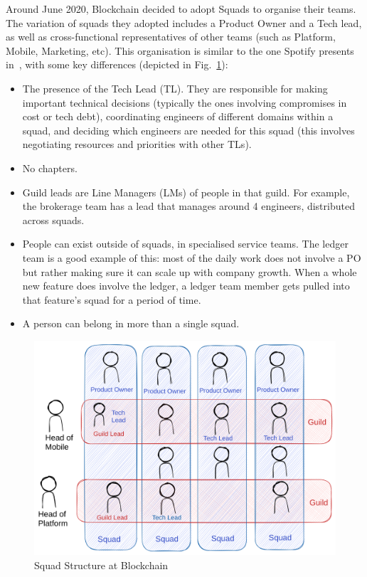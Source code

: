\documentclass[conference]{IEEEtran}
\begin{document}
    Around June 2020, Blockchain decided to adopt Squads to organise their teams.
    The variation of squads they adopted includes a Product Owner and a Tech lead, as well as cross-functional representatives of other teams (such as Platform, Mobile, Marketing, etc).
    This organisation is similar to the one Spotify presents in~\cite{spotifySquads}, with some key differences (depicted in Fig.~\ref{fig:squad}):
    \begin{itemize}
        \item The presence of the Tech Lead (TL).
        They are responsible for making important technical decisions (typically the ones involving compromises in cost or tech debt), coordinating engineers of different domains within a squad, and deciding which engineers are needed for this squad (this involves negotiating resources and priorities with other TLs).
        \item No chapters.
        \item Guild leads are Line Managers (LMs) of people in that guild.
        For example, the brokerage team has a lead that manages around 4 engineers, distributed across squads.
        \item People can exist outside of squads, in specialised service teams.
        The ledger team is a good example of this: most of the daily work does not involve a PO but rather making sure it can scale up with company growth.
        When a whole new feature does involve the ledger, a ledger team member gets pulled into that feature's squad for a period of time.
        \item A person can belong in more than a single squad.
    \end{itemize}

    \begin{figure}[h]
        \centering
        \includegraphics[width=0.94\columnwidth]{bcSquads}
        \caption{Squad Structure at Blockchain}
        \label{fig:squad}
    \end{figure}
\end{document}
